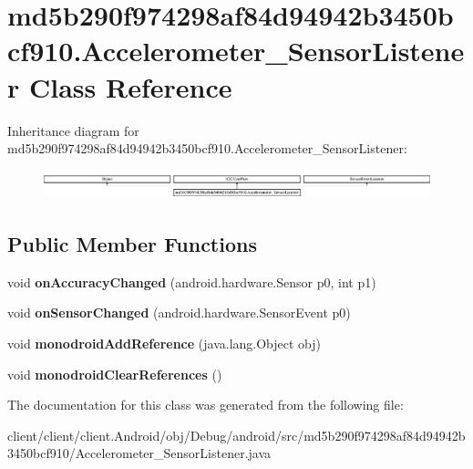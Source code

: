 \hypertarget{classmd5b290f974298af84d94942b3450bcf910_1_1Accelerometer__SensorListener}{}\section{md5b290f974298af84d94942b3450bcf910.\+Accelerometer\+\_\+\+Sensor\+Listener Class Reference}
\label{classmd5b290f974298af84d94942b3450bcf910_1_1Accelerometer__SensorListener}
Inheritance diagram for md5b290f974298af84d94942b3450bcf910.\+Accelerometer\+\_\+\+Sensor\+Listener\+:\begin{figure}[H]
\begin{center}
\leavevmode
\includegraphics[height=0.854310cm]{classmd5b290f974298af84d94942b3450bcf910_1_1Accelerometer__SensorListener}
\end{center}
\end{figure}
\subsection*{Public Member Functions}
\begin{DoxyCompactItemize}
\item 
\hypertarget{classmd5b290f974298af84d94942b3450bcf910_1_1Accelerometer__SensorListener_a768678ee4103105f7d28b5f7c49562f0}{}void {\bfseries on\+Accuracy\+Changed} (android.\+hardware.\+Sensor p0, int p1)\label{classmd5b290f974298af84d94942b3450bcf910_1_1Accelerometer__SensorListener_a768678ee4103105f7d28b5f7c49562f0}

\item 
\hypertarget{classmd5b290f974298af84d94942b3450bcf910_1_1Accelerometer__SensorListener_ac8267a067681f3bb874557a214bda1c2}{}void {\bfseries on\+Sensor\+Changed} (android.\+hardware.\+Sensor\+Event p0)\label{classmd5b290f974298af84d94942b3450bcf910_1_1Accelerometer__SensorListener_ac8267a067681f3bb874557a214bda1c2}

\item 
\hypertarget{classmd5b290f974298af84d94942b3450bcf910_1_1Accelerometer__SensorListener_a07f1b4e3aa118ceb2f1bf07ea18fed43}{}void {\bfseries monodroid\+Add\+Reference} (java.\+lang.\+Object obj)\label{classmd5b290f974298af84d94942b3450bcf910_1_1Accelerometer__SensorListener_a07f1b4e3aa118ceb2f1bf07ea18fed43}

\item 
\hypertarget{classmd5b290f974298af84d94942b3450bcf910_1_1Accelerometer__SensorListener_a29a119be304b34f8f1503b88ea59cf1a}{}void {\bfseries monodroid\+Clear\+References} ()\label{classmd5b290f974298af84d94942b3450bcf910_1_1Accelerometer__SensorListener_a29a119be304b34f8f1503b88ea59cf1a}

\end{DoxyCompactItemize}


The documentation for this class was generated from the following file\+:\begin{DoxyCompactItemize}
\item 
client/client/client.\+Android/obj/\+Debug/android/src/md5b290f974298af84d94942b3450bcf910/Accelerometer\+\_\+\+Sensor\+Listener.\+java\end{DoxyCompactItemize}
